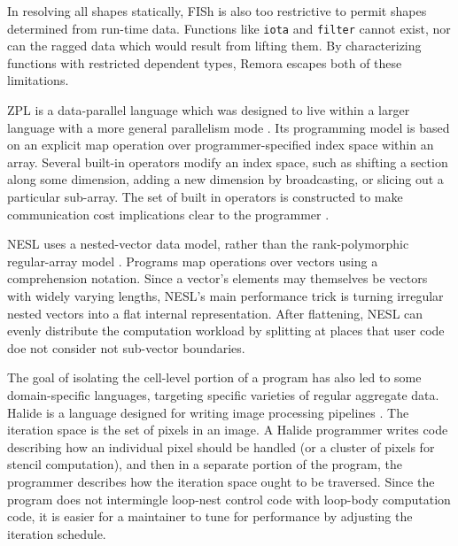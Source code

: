 In resolving all shapes statically,
FISh is also too restrictive to permit shapes determined from run-time data.
Functions like {\tt iota} and {\tt filter} cannot exist,
nor can the ragged data which would result from lifting them.
By characterizing functions with restricted dependent types,
Remora escapes both of these limitations.



ZPL is a data-parallel language
which was designed to live within a larger language
with a more general parallelism mode \cite{ZPLArraySublang}.
Its programming model is based on
an explicit map operation
over programmer-specified index space within an array.
Several built-in operators modify an index space,
such as shifting a section along some dimension,
adding a new dimension by broadcasting,
or slicing out a particular sub-array.
The set of built in operators is constructed
to make communication cost implications clear to the programmer \cite{ZPLPerformance}.

NESL uses a nested-vector data model,
rather than the rank-polymorphic regular-array model \cite{NESL}.
Programs map operations over vectors using a comprehension notation.
Since a vector's elements may themselves be vectors
with widely varying lengths,
NESL's main performance trick is
turning irregular nested vectors into a flat internal representation.
After flattening, NESL can evenly distribute the computation workload
by splitting at places that user code doe not consider not sub-vector boundaries.



The goal of isolating the cell-level portion of a program
has also led to some domain-specific languages,
targeting specific varieties of regular aggregate data.
Halide is a language designed for writing image processing pipelines \cite{Halide}.
The iteration space is the set of pixels in an image.
A Halide programmer writes code describing
how an individual pixel should be handled
(or a cluster of pixels for stencil computation),
and then in a separate portion of the program,
the programmer describes how the iteration space ought to be traversed.
Since the program does not intermingle
loop-nest control code with loop-body computation code,
it is easier for a maintainer to tune for performance
by adjusting the iteration schedule.

